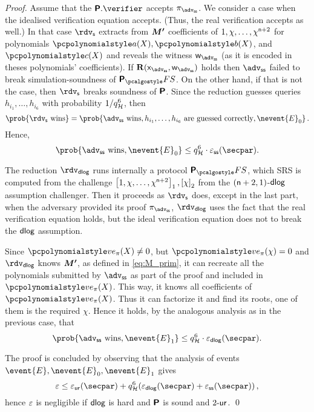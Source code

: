 \documentclass[runningheads,11pt]{llncs}
\let\spvec\vec
\let\vec\accentvec
\let\spvec\vec
\let\vec\spvec
\def\vec#1{\mathchoice{\mbox{\boldmath$\displaystyle#1$}}
  {\mbox{\boldmath$\textstyle#1$}} {\mbox{\boldmath$\scriptstyle#1$}}
  {\mbox{\boldmath$\scriptscriptstyle#1$}}}
\begin{document}
\begin{proof}
  Assume that the $\plonkprot.\verifier$ accepts $\zkproof_\advss$. We consider
  a case when the idealised verification equation accepts. (Thus, the real
  verification accepts as well.) In that case $\rdvs$ extracts from $\vec{M'}$
  coefficients of $1, \chi, \ldots, \chi^{\mathsf{n} + 2}$ for
  polynomials $\p{a}(X), \p{b}(X)$, and $\p{c}(X)$ and reveals the witness
  $\wit_\advss$ (as it is encoded in theses polynomials' coefficients). If
  $\REL(\inp_\advss, \wit_\advss)$ holds then $\advss$ failed to break
  simulation-soundness of $\plonkprotfs$. On the other hand, if that is not the
  case, then $\rdvs$ breaks soundness of $\bm{\mathsf{P}}$.
  Since the reduction guesses queries $h_{i_1}, \ldots, h_{i_6}$ with
  probability $1/q_{\mathcal{H}}^6$, then
  \[
    \prob{\rdvs \text{ wins}} = \prob{\advss \text{ wins}, h_{i_1}, \ldots,
      h_{i_6} \text{ are guessed correctly}, \nevent{E}_0}\,.
  \]
  Hence,
  \[
    \prob{\advss \text{ wins}, \nevent{E}_0} \leq q_\ro^6 \cdot \epsss(\secpar).
  \]

   The reduction $\rdvdlog$ runs internally a
  protocol $\plonkprotfs$, which SRS is computed from the challenge
  $\left[1, \chi, \ldots, \chi^{\mathsf{n} + 2}\right]_{1}, \left[\chi\right]_{2}$ from the
  $(\mathsf{n} + 2, 1)$-$\mathsf{dlog}$ assumption challenger. Then it proceeds
  as $\rdvs$ does, except in the last part, when the adversary provided its
  proof $\zkproof_\advss$, $\rdvdlog$ uses the fact that the real verification
  equation holds, but the ideal verification equation does not to break the
  $\mathsf{dlog}$ assumption.

  Since $\vereq_\zkproof(X) \neq 0$, but $\vereq_\zkproof(\chi) = 0$ and $\rdvdlog$ knows
  $\vec{M'}$, as defined in \cref{eq:M_prim}, it can recreate all the
  polynomials submitted by $\advss$ as part of the proof and included in
  $\vereq_\zkproof(X)$. This way, it knows all coefficients of $\vereq_\zkproof(X)$. Thus it can
  factorize it and find its roots, one of them is the required $\chi$. Hence it
  holds, by the analogous analysis as in the previous case, that
  \[
    \prob{\advss \text{ wins}, \nevent{E}_1} \leq q_\ro^6 \cdot
    \eps_{\dlog}(\secpar).
  \]

  The proof is concluded by observing that the analysis of events
  $\event{E}, \nevent{E}_0, \nevent{E}_1$ gives
  \[
    \eps \leq \epsur(\secpar) + q_\ro^6 (\eps_{\dlog}(\secpar) +
    \epsss(\secpar))\,,
  \]
  hence $\varepsilon$ is negligible if $\mathsf{dlog}$ is hard and $\bm{\mathsf{P}}$ is sound and
  ${2\text{-}\mathsf{ur}}$.  \qed
\end{proof}
\end{document}
